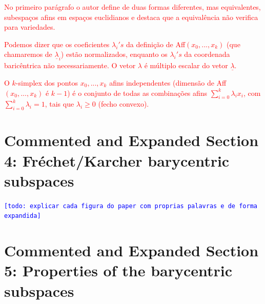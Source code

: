 \documentclass[a4paper,titlepage]{article}
\newcommand{\indraftnote}[1]{\textcolor{blue}{\texttt{\footnotesize [#1]}}}
\newcommand{\todo}[1]{\indraftnote{todo: #1}} %
\newcommand{\juliana}[1]{\textcolor{red}{#1}}
\begin{document}
\juliana{No primeiro parágrafo o autor define de duas formas diferentes, mas equivalentes, subespaços afins em espaços euclidianos e destaca que a equivalência não verifica para variedades.}

\juliana{Podemos dizer que os coeficientes $\lambda_i's$ da definição de Aff$(x_0 ,..., x_k)$ (que chamaremos de $\underline{\lambda}_i$) estão normalizados, enquanto os $\lambda_i's$ da coordenada baricêntrica não necessariamente. O vetor $\lambda$ é múltiplo escalar do vetor $\underline{\lambda}$.} 

\juliana{O $k$-simplex dos pontos $x_0, ..., x_k$ afins independentes (dimensão de Aff$(x_0 ,..., x_k)$ é $k-1$) é o conjunto de todas as combinações afins $\sum_{i=0}^k \lambda_i x_i$, com $\sum_{i=0}^k \lambda_i=1$, tais que $\lambda_i \geq 0$ (fecho convexo).}

{
\vspace{1em}
\vspace{1em}
}

\section{Commented and Expanded Section 4: Fréchet/Karcher barycentric subspaces}

{
\vspace{1em}
\vspace{1em}
}


\todo{explicar cada figura do paper com proprias palavras e de forma expandida}

\section{Commented and Expanded Section 5: Properties of the barycentric
subspaces}
\end{document}
